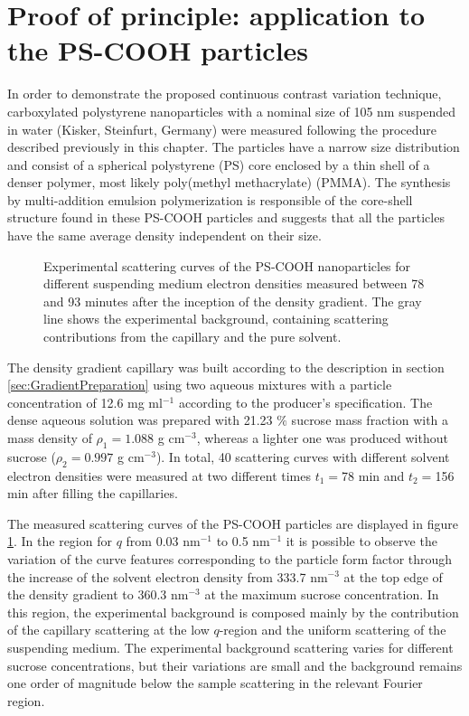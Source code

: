 \section{Proof of principle: application to the PS-COOH particles}
\label{sec:KiskerResults}

In order to demonstrate the proposed continuous contrast variation technique, carboxylated polystyrene nanoparticles with a nominal size of 105 nm suspended in water (Kisker, Steinfurt, Germany) were measured following the procedure described previously in this chapter. The particles have a narrow size distribution and consist of a spherical polystyrene (PS) core enclosed by a thin shell of a denser polymer, most likely poly(methyl methacrylate) (PMMA). The synthesis by multi-addition emulsion polymerization is responsible of the core-shell structure found in these PS-COOH particles and suggests that all the particles have the same average density independent on their size.

\begin{figure}%
	\centering
		
		\caption[Experimental scattering curves of the PS-COOH particles for different suspending medium electron densities.]{Experimental scattering curves of the PS-COOH nanoparticles for different suspending medium electron densities measured between 78 and 93 minutes after the inception of the density gradient. The gray line shows the experimental background, containing scattering contributions from the capillary and the pure solvent.}
		\label{fig:KiskerContinuousSAXS}
\end{figure}

The density gradient capillary was built according to the description in section \ref{sec:GradientPreparation} using two aqueous mixtures with a particle concentration of 12.6 mg ml$^{-1}$ according to the producer's specification. The dense aqueous solution was prepared with 21.23 $\%$ sucrose mass fraction with a mass density of \(\rho_1=1.088 \) g cm$^{-3}$, whereas a lighter one was produced without sucrose (\(\rho_2=0.997 \) g cm$^{-3}$). In total, 40 scattering curves with different solvent electron densities were measured at two different times \(t_1=\)78 min and \(t_2=\)156 min after filling the capillaries.

The measured scattering curves of the PS-COOH particles are displayed in figure \ref{fig:KiskerContinuousSAXS}. In the region for \(q\) from 0.03 nm\(^{-1}\) to 0.5 nm\(^{-1}\) it is possible to observe the variation of the curve features corresponding to the particle form factor through the increase of the solvent electron density from 333.7 nm\(^{-3}\) at the top edge of the density gradient to 360.3 nm\(^{-3}\) at the maximum sucrose concentration. In this region, the experimental background is composed mainly by the contribution of the capillary scattering at the low $q$-region and the uniform scattering of the suspending medium. The experimental background scattering varies for different sucrose concentrations, but their variations are small and the background remains one order of magnitude below the sample scattering in the relevant Fourier region.

